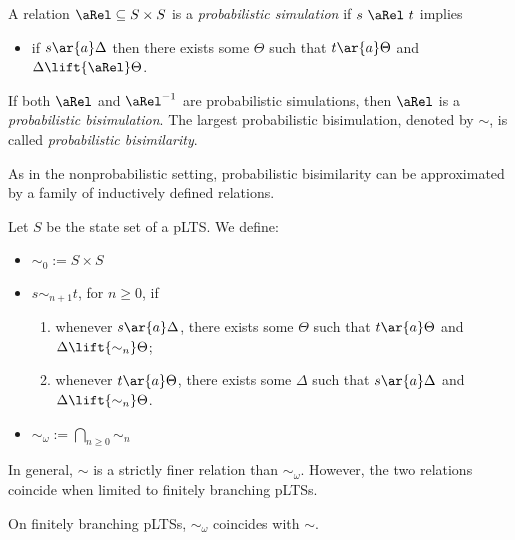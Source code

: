 \documentclass{article}
\def \BISI{\sim}
\begin{document}
\begin{definition}\label{d:sbisi2}
A relation $\aRel\subseteq S \times S$ is a {\em probabilistic
  simulation} if $s\ \aRel\ t$ implies
\begin{itemize}
\item if $s\ar{a}\Delta$ then there exists some $\Theta$ such that
  $t\ar{a}\Theta$ and $\Delta \lift{\aRel} \Theta$.
\end{itemize}
If both $\aRel$ and $\aRel^{-1}$ are probabilistic simulations, then
$\aRel$ is a {\em
  probabilistic bisimulation}. The largest probabilistic
  bisimulation, denoted by $\BISI$, is called \emph{probabilistic
  bisimilarity}.
\end{definition}



As in the nonprobabilistic setting, probabilistic bisimilarity can
be approximated by a family of inductively defined relations.
\begin{definition}
Let $S$ be the state set of a pLTS. We define:
\begin{itemize}
\item $\BISI_0:=S\times S$
\item $s\BISI_{n+1}t$, for $n\geq 0$, if
\begin{enumerate}
\item whenever $s\ar{a}\Delta$, there exists some $\Theta$ such
that $t\ar{a}\Theta$ and $\Delta\lift{\BISI_n} \Theta$;
\item whenever $t\ar{a}\Theta$, there exists some $\Delta$ such
that $s\ar{a}\Delta$ and $\Delta\lift{\BISI_n} \Theta$.
\end{enumerate}
\item $\BISI_{\omega}:=\bigcap_{n\geq 0}\BISI_n$
\end{itemize}
\end{definition}
In general, $\BISI$ is a strictly finer relation than
$\BISI_\omega$. However, the two relations coincide when limited to
finitely branching pLTSs.
\begin{proposition}\label{p:app}
On finitely branching pLTSs, $\BISI_\omega$ coincides with $\BISI$.
\end{proposition}
\end{document}
